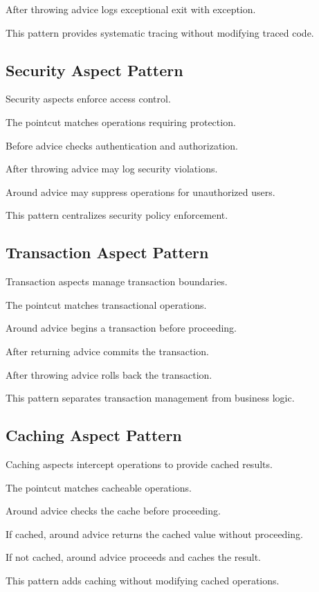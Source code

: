 \documentclass[11pt]{article}
\begin{document}
After throwing advice logs exceptional exit with exception.

This pattern provides systematic tracing without modifying traced code.

\subsection{Security Aspect Pattern}

Security aspects enforce access control.

The pointcut matches operations requiring protection.

Before advice checks authentication and authorization.

After throwing advice may log security violations.

Around advice may suppress operations for unauthorized users.

This pattern centralizes security policy enforcement.

\subsection{Transaction Aspect Pattern}

Transaction aspects manage transaction boundaries.

The pointcut matches transactional operations.

Around advice begins a transaction before proceeding.

After returning advice commits the transaction.

After throwing advice rolls back the transaction.

This pattern separates transaction management from business logic.

\subsection{Caching Aspect Pattern}

Caching aspects intercept operations to provide cached results.

The pointcut matches cacheable operations.

Around advice checks the cache before proceeding.

If cached, around advice returns the cached value without proceeding.

If not cached, around advice proceeds and caches the result.

This pattern adds caching without modifying cached operations.
\end{document}
